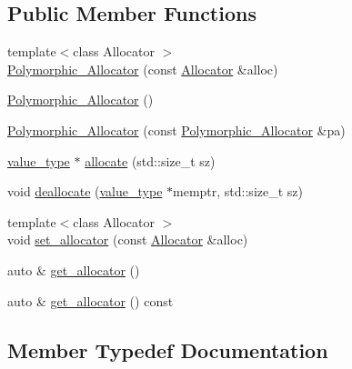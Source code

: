 \subsection*{Public Member Functions}
\begin{DoxyCompactItemize}
\item 
{\footnotesize template$<$class Allocator $>$ }\\\hyperlink{structBC_1_1allocators_1_1fancy_1_1Polymorphic__Allocator_a346301d47716c7473d1eaa82248701ae}{Polymorphic\+\_\+\+Allocator} (const \hyperlink{namespaceBC_a934f94b17b06290e6b241e5f59930c5f}{Allocator} \&alloc)
\item 
\hyperlink{structBC_1_1allocators_1_1fancy_1_1Polymorphic__Allocator_a74d406b046b865a14957b3e095aa63b0}{Polymorphic\+\_\+\+Allocator} ()
\item 
\hyperlink{structBC_1_1allocators_1_1fancy_1_1Polymorphic__Allocator_afa671ea10ff3ea4b1ab0a7950dc4e493}{Polymorphic\+\_\+\+Allocator} (const \hyperlink{structBC_1_1allocators_1_1fancy_1_1Polymorphic__Allocator}{Polymorphic\+\_\+\+Allocator} \&pa)
\item 
\hyperlink{structBC_1_1allocators_1_1fancy_1_1Polymorphic__Allocator_a644020fa0a4109c775c0ae7de878f518}{value\+\_\+type} $\ast$ \hyperlink{structBC_1_1allocators_1_1fancy_1_1Polymorphic__Allocator_aa2b8b17a5752b855a68200059facbd99}{allocate} (std\+::size\+\_\+t sz)
\item 
void \hyperlink{structBC_1_1allocators_1_1fancy_1_1Polymorphic__Allocator_a209389dc22af7eda2cbbc6c09f4abf01}{deallocate} (\hyperlink{structBC_1_1allocators_1_1fancy_1_1Polymorphic__Allocator_a644020fa0a4109c775c0ae7de878f518}{value\+\_\+type} $\ast$memptr, std\+::size\+\_\+t sz)
\item 
{\footnotesize template$<$class Allocator $>$ }\\void \hyperlink{structBC_1_1allocators_1_1fancy_1_1Polymorphic__Allocator_af74a4735ac739cb6c4945dabf52f1e61}{set\+\_\+allocator} (const \hyperlink{namespaceBC_a934f94b17b06290e6b241e5f59930c5f}{Allocator} \&alloc)
\item 
auto \& \hyperlink{structBC_1_1allocators_1_1fancy_1_1Polymorphic__Allocator_a18219c26137f09396a13f21d5d31f915}{get\+\_\+allocator} ()
\item 
auto \& \hyperlink{structBC_1_1allocators_1_1fancy_1_1Polymorphic__Allocator_a3e116f8951fd7a91a2835afd3ed4916e}{get\+\_\+allocator} () const 
\end{DoxyCompactItemize}


\subsection{Member Typedef Documentation}
